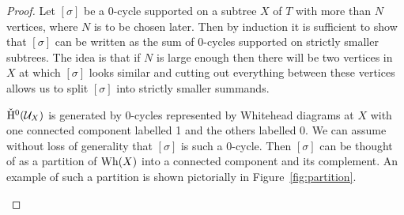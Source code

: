\begin{proof}
  Let $[\sigma]$ be a 0-cycle supported on a subtree $X$ of $T$ with more than $N$ vertices, where $N$ is to be chosen later.
  Then by induction it is sufficient to show that $[\sigma]$ can be written as the sum of 0-cycles supported on strictly smaller subtrees.
  The idea is that if $N$ is large enough then there will be two vertices in $X$ at which $[\sigma]$ looks similar and cutting out everything between these vertices allows us to split $[\sigma]$ into strictly smaller summands.

  $\check{\mathrm{H}}{}^0(\mathcal{U}_X)$ is generated by 0-cycles represented by Whitehead diagrams at $X$ with one connected component labelled 1 and the others labelled 0.
  We can assume without loss of generality that $[\sigma]$ is such a 0-cycle.
  Then $[\sigma]$ can be thought of as a partition of $\mathrm{Wh}(X)$ into a connected component and its complement.
  An example of such a partition is shown pictorially in Figure~\ref{fig:partition}.

\begin{figure}
\centering

\end{figure}
\end{proof}
